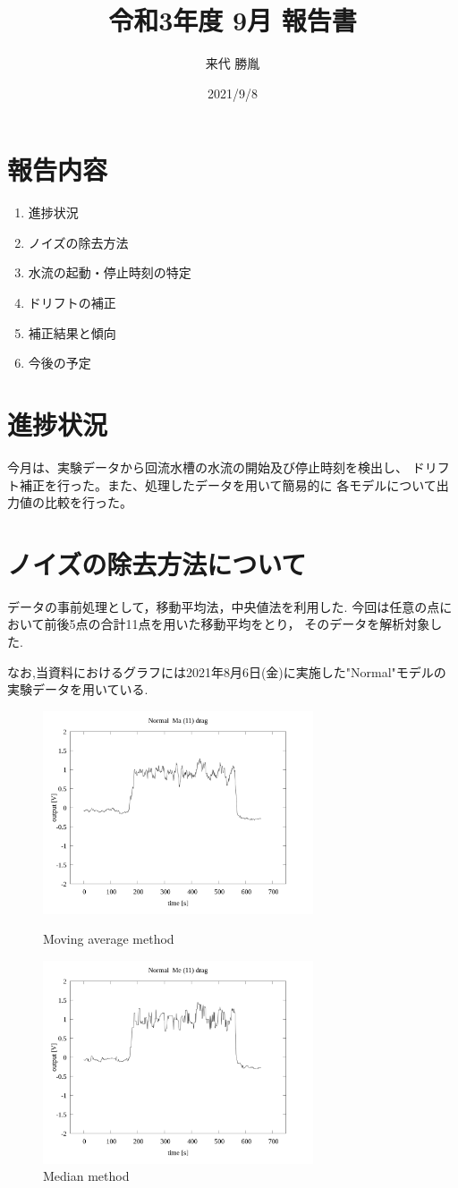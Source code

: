 \documentclass[twocolumn,a4j]{jsarticle}
\author{来代 勝胤}
\title{令和3年度 9月 報告書}
\date{2021/9/8}
\begin{document}
\columnseprule=0.1mm

\maketitle
\section*{報告内容}
\begin{enumerate}[1.]
    \item 進捗状況
    \item ノイズの除去方法
    \item 水流の起動・停止時刻の特定
    \item ドリフトの補正
    \item 補正結果と傾向
    \item 今後の予定
\end{enumerate}
\section{進捗状況}
今月は、実験データから回流水槽の水流の開始及び停止時刻を検出し、
ドリフト補正を行った。また、処理したデータを用いて簡易的に
各モデルについて出力値の比較を行った。
\section{ノイズの除去方法について}
データの事前処理として，移動平均法，中央値法を利用した.
今回は任意の点において前後5点の合計11点を用いた移動平均をとり，
そのデータを解析対象した.
\par
なお,当資料におけるグラフには2021年8月6日(金)に実施した"Normal"モデルの実験データを用いている.
\begin{figure}[htbp]
    \footnotesize
    \begin{center}
        \includegraphics[width=80mm]{images/Normal_ma(11)_drag_01.png}
        \caption{Moving average method}
        \includegraphics[width=80mm]{images/Normal_me(11)_drag_01.png}
        \caption{Median method}
    \end{center}
\end{figure}
\end{document}
